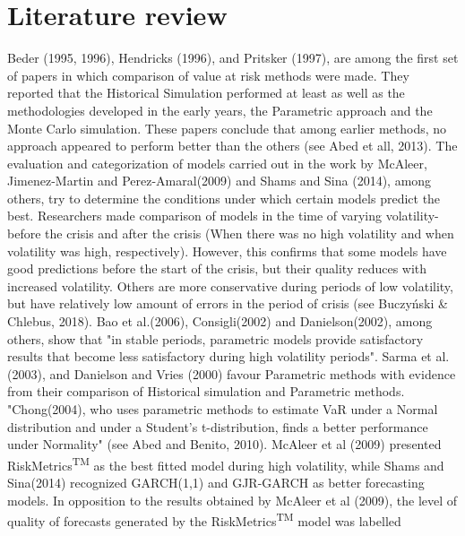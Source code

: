 \documentclass[a4paper,11pt,oneside]{book}
\begin{document}



\section{Literature review}

Beder (1995, 1996), Hendricks (1996), and
Pritsker (1997), are among the first set of papers in which comparison of value at risk methods were made. They reported that the Historical Simulation performed at least as well as the methodologies developed in the early years, the Parametric approach and the Monte Carlo simulation. These papers conclude that among earlier methods, no approach appeared to perform better than the
others (see Abed et all, 2013). The evaluation and categorization of models carried out in the work by McAleer, Jimenez-Martin and Perez-Amaral(2009) and Shams and Sina (2014), among others, try to determine the conditions under which certain models predict the best. Researchers made comparison of models in the time of varying volatility-before the crisis and after the crisis (When there was no high volatility and when volatility was high, respectively). However, this confirms that some models have good predictions before the start of the crisis, but their quality reduces with increased volatility. Others are more conservative during periods of low volatility, but have relatively low amount of errors in the period of crisis (see Buczyński \& Chlebus, 2018).
\newline\newline
Bao et al.(2006), Consigli(2002) and Danielson(2002), among
others, show that "in stable periods, parametric models provide satisfactory results
that become less satisfactory during high volatility periods". Sarma et al. (2003), and Danielson and Vries (2000) favour Parametric methods with evidence from their comparison of Historical simulation and Parametric methods. "Chong(2004),
who uses parametric methods to estimate VaR under a Normal distribution and under a
Student’s t-distribution, finds a better performance under Normality" (see Abed and Benito, 2010). McAleer et al (2009) presented RiskMetrics\textsuperscript{TM} as
the best fitted model during high volatility, while Shams and Sina(2014) recognized GARCH(1,1) and GJR-GARCH as better
forecasting models. In opposition to the results obtained
by McAleer et al (2009), the level of quality of forecasts
generated by the RiskMetrics\textsuperscript{TM} model was labelled
\end{document}
